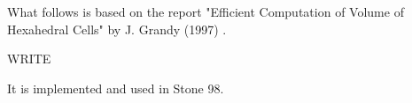 
What follows is based on the report "Efficient Computation of Volume of
Hexahedral Cells" by J. Grandy (1997) \cite{gran97}.

WRITE

It is implemented and used in Stone 98.


